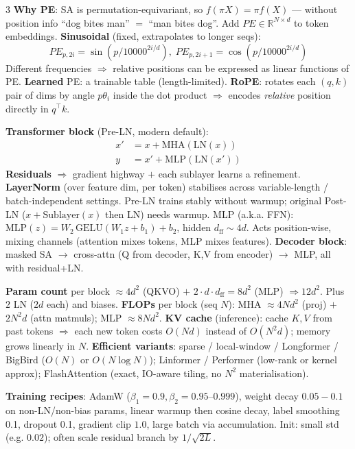 \documentclass[a4paper,9pt,landscape]{scrartcl}
\newcommand{\R}{\mathbb{R}}
\begin{document}
\begin{multicols*}{3}
\textbf{Why PE}: SA is permutation-equivariant, so $f(\pi X){=}\pi f(X)$ — without position info ``dog bites man'' $=$ ``man bites dog''. Add $PE\!\in\!\R^{N\times d}$ to token embeddings.
\textbf{Sinusoidal} (fixed, extrapolates to longer seqs):
$$PE_{p,2i}=\sin(p/10000^{2i/d}),\;PE_{p,2i+1}=\cos(p/10000^{2i/d})$$
Different frequencies $\Rightarrow$ relative positions can be expressed as linear functions of PE. \textbf{Learned} PE: a trainable table (length-limited). \textbf{RoPE}: rotates each $(q,k)$ pair of dims by angle $p\theta_i$ inside the dot product $\Rightarrow$ encodes \emph{relative} position directly in $q^\top k$.

\textbf{Transformer block} (Pre-LN, modern default):
\begin{align*}
x'&=x+\mathrm{MHA}(\mathrm{LN}(x))\\
y&=x'+\mathrm{MLP}(\mathrm{LN}(x'))
\end{align*}
\textbf{Residuals} $\Rightarrow$ gradient highway $+$ each sublayer learns a refinement. \textbf{LayerNorm} (over feature dim, per token) stabilises across variable-length / batch-independent settings. Pre-LN trains stably without warmup; original Post-LN ($x{+}\mathrm{Sublayer}(x)$ then LN) needs warmup.
MLP (a.k.a. FFN): $\mathrm{MLP}(z)=W_2\,\mathrm{GELU}(W_1 z+b_1)+b_2$, hidden $d_{\mathrm{ff}}{\sim}4d$. Acts position-wise, mixing channels (attention mixes tokens, MLP mixes features).
\textbf{Decoder block}: masked SA $\to$ cross-attn (Q from decoder, K,V from encoder) $\to$ MLP, all with residual+LN.

\textbf{Param count} per block $\approx 4d^2$ (QKVO) $+$ $2\cdot d\cdot d_{\mathrm{ff}}{=}8d^2$ (MLP) $\Rightarrow 12d^2$. Plus $2$ LN ($2d$ each) and biases.
\textbf{FLOPs} per block (seq $N$): MHA $\approx 4Nd^2$ (proj) $+$ $2N^2 d$ (attn matmuls); MLP $\approx 8Nd^2$.
\textbf{KV cache} (inference): cache $K,V$ from past tokens $\Rightarrow$ each new token costs $O(Nd)$ instead of $O(N^2 d)$; memory grows linearly in $N$.
\textbf{Efficient variants}: sparse / local-window / Longformer / BigBird ($O(N)$ or $O(N\log N)$); Linformer / Performer (low-rank or kernel approx); FlashAttention (exact, IO-aware tiling, no $N^2$ materialisation).

\textbf{Training recipes}: AdamW ($\beta_1{=}0.9,\beta_2{=}0.95\text{--}0.999$), weight decay $0.05{-}0.1$ on non-LN/non-bias params, linear warmup then cosine decay, label smoothing 0.1, dropout 0.1, gradient clip $1.0$, large batch via accumulation. Init: small std (e.g. $0.02$); often scale residual branch by $1/\sqrt{2L}$.


\end{multicols*}
\end{document}
